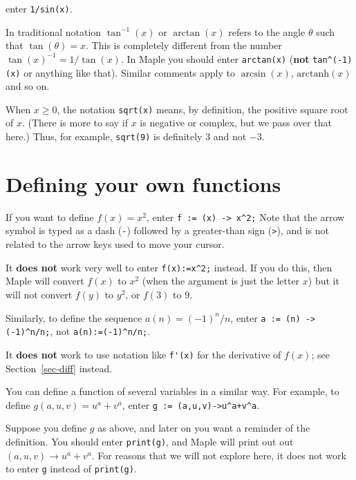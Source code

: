 \documentclass{amsart}
\begin{document}
\begin{secenum}
  enter \verb~1/sin(x)~. 
%
 \item\label{arctan} In traditional notation $\tan^{-1}(x)$ or $\arctan(x)$ refers
  to the angle $\theta$ such that $\tan(\theta)=x$.  This is
  completely different from the number $\tan(x)^{-1}=1/\tan(x)$.  In
  Maple you should enter \verb~arctan(x)~ (\textbf{not}
  \verb~tan^(-1)(x)~ or anything like that).  Similar comments apply
  to $\arcsin(x)$, $\text{arctanh}(x)$ and so on. 
%
 \item\label{possqrt} When $x\geq 0$, the notation \verb~sqrt(x)~ means, by
  definition, the positive square root of $x$.  (There is more to say
  if $x$ is negative or complex, but we pass over that here.)  Thus,
  for example, \verb~sqrt(9)~ is definitely $3$ and not $-3$.  
\end{secenum}

\section{Defining your own functions}\label{sec-funcdef}



\begin{secenum}
%
 \item\label{arrow} If you want to define $f(x)=x^2$, enter
   \verb~f := (x) -> x^2;~  Note that the arrow symbol is
   typed as a dash (\verb~-~) followed by a greater-than
   sign (\verb~>~), and is not related to the arrow keys
   used to move your cursor.  
%
 \item\label{badfuncdef} It \textbf{does not} work very well to enter
   \verb~f(x):=x^2;~ instead.  If you do this, then Maple
   will convert $f(x)$ to $x^2$ (when the argument is just
   the letter $x$) but it will not convert $f(y)$ to $y^2$,
   or $f(3)$ to $9$. 
%
 \item\label{seriesdef}
  Similarly, to define the sequence $a(n)=(-1)^n/n$, enter
  \verb~a := (n) -> (-1)^n/n;~, not \verb~a(n):=(-1)^n/n;~. 
%
 \item\label{badderiv} It \textbf{does not} work to use notation like
   \verb~f'(x)~ for the derivative of $f(x)$; see
   Section~\ref{sec-diff} instead. 
%
 \item\label{multifunc}
  You can define a function of several variables in a similar
  way.  For example, to define $g(a,u,v)=u^a+v^a$, enter
  \verb~g := (a,u,v)->u^a+v^a~. 
%
 \item\label{showfuncdef}
  Suppose you define $g$ as above, and later on you want a
  reminder of the definition.  You should enter
  \verb~print(g)~, and Maple will print out out
  $(a,u,v)\rightarrow u^a+v^a$.  For reasons that we will not
  explore here, it does not work to enter \verb~g~ instead
  of \verb~print(g)~. 
\end{secenum}
\end{document}
